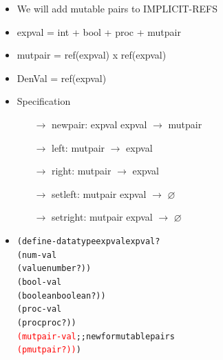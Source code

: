 \documentclass{beamer}
\newcommand{\arrow}{\(\rightarrow\)}
\begin{document}
\begin{frame}[fragile]
\begin{scriptsize}
\begin{itemize}
\item<1-> We will add mutable pairs to IMPLICIT-REFS

\item<2-> expval = int + bool + proc + mutpair

\item<2-> mutpair = ref(expval) x ref(expval)
		
\item<3-> DenVal = ref(expval)

\item<4-> Specification
\begin{itemize}
\item[\arrow] newpair: expval  expval \arrow{} mutpair
\item[\arrow] left: mutpair \arrow{} expval
\item[\arrow] right: mutpair \arrow{} expval
\item[\arrow] setleft: mutpair expval \arrow{} $\varnothing$
\item[\arrow] setright: mutpair expval \arrow{} $\varnothing$
\end{itemize}

		
\item<5->
\begin{alltt}
(define-datatype expval expval?
  (num-val
   (value number?))
  (bool-val
   (boolean boolean?))
  (proc-val
   (proc proc?))
  \textcolor{red}{(mutpair-val} ;; new for mutable pairs
   \textcolor{red}{(p mutpair?))})
\end{alltt}

\end{itemize}
\end{scriptsize}
\end{frame}
\end{document}
